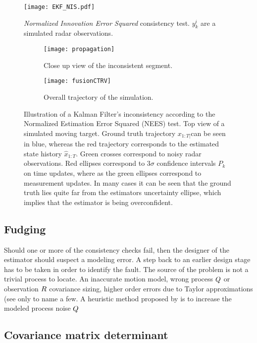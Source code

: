 \begin{figure}[H]
	\centering
	\texttt{[image: EKF\_NIS.pdf]}
	\caption{\emph{Normalized Innovation Error Squared} consistency test. $y^i_k$ are a simulated radar observations.}
	\label{fig:ekfNIS}
\end{figure}

\begin{figure}[H]
	\begin{subfigure}[b]{1.0\textwidth}
		\centering
		\texttt{[image: propagation]}
		\caption{Close up view of the inconsistent segment.}
		\label{fig:KFinconsistent1}
	\end{subfigure}\hfill
	\begin{subfigure}[b]{1.0\textwidth}
		\texttt{[image: fusionCTRV]}
		\caption{Overall trajectory of the simulation.}
		\label{fig:KFinconsistent2}
	\end{subfigure}
	\caption{Illustration of a Kalman Filter's inconsistency according to the Normalized Estimation Error Squared (NEES) test. Top view of a simulated moving target. Ground truth trajectory $x_{1:T|}$can be seen in blue,  whereas the red trajectory corresponds to the estimated state history $\hat{x}_{1:T}$. Green crosses correspond to noisy radar observations. Red ellipses correspond to $3\sigma$ confidence intervals $P_k$ on time updates, where as the green ellipses correspond to measurement updates. In many cases it can be seen that the ground truth lies quite far from the estimators uncertainty ellipse, which implies that the estimator is being overconfident.}
	\label{fig:KFinconsistent}
\end{figure}

\subsection{Fudging}
Should one or more of the consistency checks fail, then the designer of the estimator should suspect a modeling error. A step back to an earlier design stage has to be taken in order to identify the fault. The source of the problem is not a trivial process to locate. An inaccurate motion model, wrong process ${Q}$ or observation ${R}$ covariance sizing, higher order errors due to Taylor approximations (see  only to name a few. A heuristic method proposed by \cite{BarShalom1980} is to increase the modeled process noise ${Q}$

\subsection{Covariance matrix determinant}


